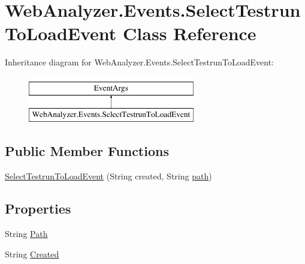 \hypertarget{class_web_analyzer_1_1_events_1_1_select_testrun_to_load_event}{}\section{Web\+Analyzer.\+Events.\+Select\+Testrun\+To\+Load\+Event Class Reference}
\label{class_web_analyzer_1_1_events_1_1_select_testrun_to_load_event}
Inheritance diagram for Web\+Analyzer.\+Events.\+Select\+Testrun\+To\+Load\+Event\+:\begin{figure}[H]
\begin{center}
\leavevmode
\includegraphics[height=2.000000cm]{class_web_analyzer_1_1_events_1_1_select_testrun_to_load_event}
\end{center}
\end{figure}
\subsection*{Public Member Functions}
\begin{DoxyCompactItemize}
\item 
\hyperlink{class_web_analyzer_1_1_events_1_1_select_testrun_to_load_event_a501c6eaae7adedfd08087018fe6e4e7c}{Select\+Testrun\+To\+Load\+Event} (String created, String \hyperlink{bin_2x64_2_release_2_u_i_2_h_t_m_l_resources_2js_2src_2create__experiment_8js_aa72e0c8a20e6bcc571d3a1c51846e627}{path})
\end{DoxyCompactItemize}
\subsection*{Properties}
\begin{DoxyCompactItemize}
\item 
String \hyperlink{class_web_analyzer_1_1_events_1_1_select_testrun_to_load_event_aa27c59c738823f2dce810a0b8f89259d}{Path}
\item 
String \hyperlink{class_web_analyzer_1_1_events_1_1_select_testrun_to_load_event_a330e145816f74dc95033cbd983552ca8}{Created}
\end{DoxyCompactItemize}
